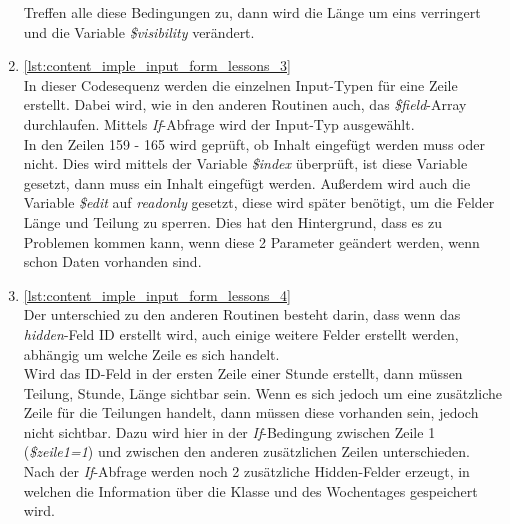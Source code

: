 \begin{enumerate}
	Treffen alle diese Bedingungen zu, dann wird die Länge um eins verringert und die Variable \textit{\$visibility} verändert.\\
	
	
	
	\item \autoref{lst:content_imple_input_form_lessons_3}\\
	In dieser Codesequenz werden die einzelnen Input-Typen für eine Zeile erstellt. Dabei wird, wie in den anderen Routinen auch, das \textit{\$field}-Array durchlaufen. Mittels \textit{If}-Abfrage wird der Input-Typ ausgewählt.\\
	In den Zeilen 159 - 165 wird geprüft, ob Inhalt eingefügt werden muss oder nicht. Dies wird mittels der Variable \textit{\$index} überprüft, ist diese Variable gesetzt, dann muss ein Inhalt eingefügt werden. Außerdem wird auch die Variable \textit{\$edit} auf \textit{readonly} gesetzt, diese wird später benötigt, um die Felder Länge und Teilung zu sperren. Dies hat den Hintergrund, dass es zu Problemen kommen kann, wenn diese 2 Parameter geändert werden, wenn schon Daten vorhanden sind.\\
	
	
	
	\item \autoref{lst:content_imple_input_form_lessons_4}\\
	Der unterschied zu den anderen Routinen besteht darin, dass wenn das \textit{hidden}-Feld ID erstellt wird, auch einige weitere Felder erstellt werden, abhängig um welche Zeile es sich handelt.\\
	Wird das ID-Feld in der ersten Zeile einer Stunde erstellt, dann müssen Teilung, Stunde, Länge sichtbar sein. Wenn es sich jedoch um eine zusätzliche Zeile für die Teilungen handelt, dann müssen diese vorhanden sein, jedoch nicht sichtbar. Dazu wird hier in der \textit{If}-Bedingung zwischen Zeile 1 (\textit{\$zeile1=1}) und zwischen den anderen zusätzlichen Zeilen unterschieden.\\
	Nach der \textit{If}-Abfrage werden noch 2 zusätzliche Hidden-Felder erzeugt, in welchen die Information über die Klasse und des Wochentages gespeichert wird.\\
	
	

\end{enumerate}
